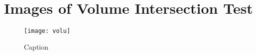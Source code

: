 
\chapter{Images of Volume Intersection Test}

\begin{landscape}
\begin{figure}
    \centering
    \texttt{[image: volu]}
    \caption{Caption}
    \label{fig:my_label}
\end{figure}
\end{landscape}
